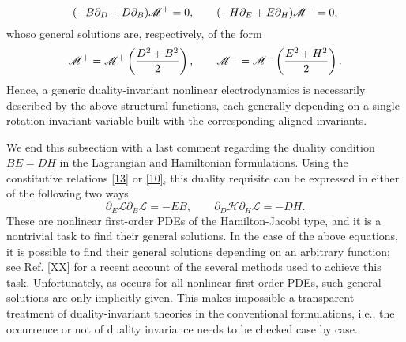 \begin{equation}\label{24}
  (-B\partial_D+D\partial_B)\mathscr{M}^+=0,\qquad (-H\partial_E+E\partial_H)\mathscr{M}^-=0,
\end{equation}
whoso general solutions are, respectively, of the form
\begin{equation}\label{25}
  \mathscr{M}^+=\mathscr{M}^+\left(\frac{D^2+B^2}{2}\right),\qquad \mathscr{M}^-=\mathscr{M}^-\left(\frac{E^2+H^2}{2}\right). 
\end{equation}
Hence, a generic duality-invariant nonlinear electrodynamics is necessarily described by the above structural functions, each generally depending on a single rotation-invariant variable built with the corresponding aligned invariants.

We end this subsection with a last comment regarding the duality condition $BE = DH$ in the Lagrangian and Hamiltonian formulations. Using the constitutive relations \eqref{13} or \eqref{10}, this duality requisite can be expressed in either of the following two ways
\begin{equation}\label{26}
  \partial_E\mathscr{L}\partial_B \mathscr{L}=-EB,\qquad \partial_D\mathscr{H}\partial_H \mathscr{L}=-DH.
\end{equation}
These are nonlinear first-order PDEs of the Hamilton-Jacobi type, and it is a nontrivial task to find their general solutions. In the case of the above equations, it is possible to find their general solutions depending on an arbitrary function; see Ref. [XX] for a recent account of the several methods used to achieve this task. Unfortunately, as occurs for all nonlinear first-order PDEs, such general solutions are only implicitly given. This makes impossible a transparent treatment of duality-invariant theories in the conventional formulations, i.e., the occurrence or not of duality invariance needs to be checked case by case.

